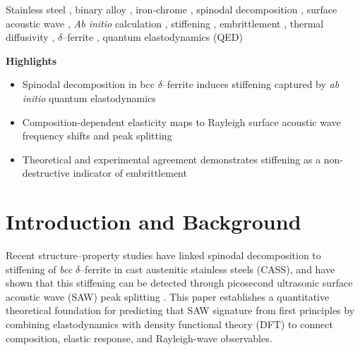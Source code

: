 \documentclass[final,3p,times]{elsarticle}
\begin{document}
\begin{frontmatter}
\begin{abstract}
\end{abstract}

\begin{keyword}
Stainless steel \sep 
binary alloy \sep
iron-chrome \sep
spinodal decomposition
\sep
surface acoustic wave \sep 
\emph{Ab initio} calculation
\sep
stiffening
\sep
embrittlement
\sep
thermal diffusivity
\sep
$\delta$--ferrite
\sep
quantum elastodynamics (QED)


\end{keyword}

\end{frontmatter}

\textbf{Highlights}

\begin{itemize}
\item Spinodal decomposition in bcc $\delta$--ferrite induces stiffening captured by \emph{ab initio} quantum elastodynamics
\item Composition-dependent elasticity maps to Rayleigh surface acoustic wave frequency shifts and peak splitting
\item Theoretical and experimental agreement demonstrates stiffening as a non-destructive indicator of embrittlement
\end{itemize}


\section{Introduction and Background}
Recent structure--property studies have linked spinodal decomposition to stiffening of \textit{bcc} $\delta$--ferrite in cast austenitic stainless steels (CASS), and have shown that this stiffening can be detected through picosecond ultrasonic surface acoustic wave (SAW) peak splitting \cite{al2023detecting, al2020detecting,al2020non}. 
This paper establishes a quantitative theoretical foundation for predicting that SAW signature from first principles by combining elastodynamics with density functional theory (DFT) to connect composition, elastic response, and Rayleigh-wave observables.
\end{document}
